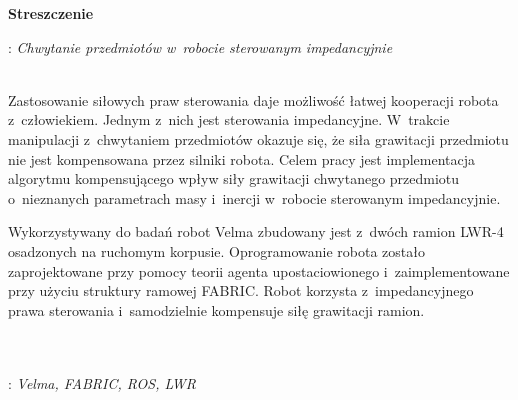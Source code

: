 


\clearpage\mbox{}\thispagestyle{empty}\newpage




%

\clearpage\mbox{}\newpage



\vspace*{\baselineskip}
\begin{center}
	{\large\bfseries Streszczenie}\par\bigskip
\end{center}
: {\itshape Chwytanie przedmiotów w~robocie sterowanym impedancyjnie}
\\\\
{
	Zastosowanie siłowych praw sterowania daje możliwość łatwej kooperacji robota z~człowiekiem. Jednym z~nich jest sterowania impedancyjne. W~trakcie manipulacji z~chwytaniem przedmiotów okazuje się, że siła grawitacji przedmiotu nie jest kompensowana przez silniki robota. Celem pracy jest implementacja algorytmu kompensującego wpływ siły grawitacji chwytanego przedmiotu o~nieznanych parametrach masy i~inercji w~robocie sterowanym impedancyjnie.
	
	Wykorzystywany do badań robot Velma zbudowany jest z~dwóch ramion LWR-4 osadzonych na ruchomym korpusie. Oprogramowanie robota zostało zaprojektowane przy pomocy teorii agenta upostaciowionego i~zaimplementowane przy użyciu struktury ramowej FABRIC. Robot korzysta z~impedancyjnego prawa sterowania i~samodzielnie kompensuje siłę grawitacji ramion. 
}\\\\
\vspace*{0.6\baselineskip}
: {\itshape Velma, FABRIC, ROS, LWR}

\clearpage\mbox{}\newpage


